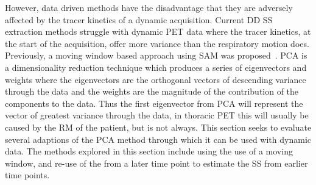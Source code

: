             However, data driven methods have the disadvantage that they are adversely affected by the tracer kinetics of a dynamic acquisition. Current \gls{DD} \gls{SS} extraction methods struggle with dynamic \gls{PET} data where the tracer kinetics, at the start of the acquisition, offer more variance than the respiratory motion does. Previously, a moving window based approach using \gls{SAM} was proposed~. \gls{PCA} is a dimensionality reduction technique which produces a series of eigenvectors and weights where the eigenvectors are the orthogonal vectors of descending variance through the data and the weights are the magnitude of the contribution of the components to the data. Thus the first eigenvector from \gls{PCA} will represent the vector of greatest variance through the data, in thoracic \gls{PET} this will usually be caused by the \gls{RM} of the patient, but is not always. This section seeks to evaluate several adaptions of the \gls{PCA} method through which it can be used with dynamic data. The methods explored in this section include using the use of a moving window, and re-use of the  from a later time point to estimate the \gls{SS} from earlier time points.
        

